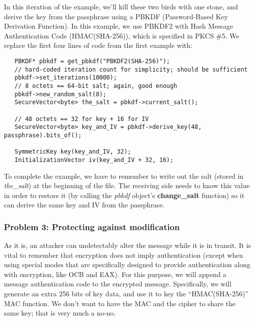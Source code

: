\documentclass{article}
\newcommand{\function}[1]{\textbf{#1}}
\newcommand{\variable}[1]{\textsl{#1}}
\begin{document}
In this iteration of the example, we'll kill these two birds with one
stone, and derive the key from the passphrase using a PBKDF
(Password-Based Key Derivation Function). In this example, we use
PBKDF2 with Hash Message Authentication Code (HMAC(SHA-256)), which is
specified in PKCS \#5. We replace the first four lines of code from
the first example with:

\begin{verbatim}
   PBKDF* pbkdf = get_pbkdf("PBKDF2(SHA-256)");
   // hard-coded iteration count for simplicity; should be sufficient
   pbkdf->set_iterations(10000);
   // 8 octets == 64-bit salt; again, good enough
   pbkdf->new_random_salt(8);
   SecureVector<byte> the_salt = pbkdf->current_salt();

   // 48 octets == 32 for key + 16 for IV
   SecureVector<byte> key_and_IV = pbkdf->derive_key(48, passphrase).bits_of();

   SymmetricKey key(key_and_IV, 32);
   InitializationVector iv(key_and_IV + 32, 16);
\end{verbatim}

To complete the example, we have to remember to write out the salt (stored in
\variable{the\_salt}) at the beginning of the file. The receiving side needs to
know this value in order to restore it (by calling the \variable{pbkdf} object's
\function{change\_salt} function) so it can derive the same key and IV from the
passphrase.

\subsubsection{Problem 3: Protecting against modification}

As it is, an attacker can undetectably alter the message while it is
in transit. It is vital to remember that encryption does not imply
authentication (except when using special modes that are specifically
designed to provide authentication along with encryption, like OCB and
EAX). For this purpose, we will append a message authentication code
to the encrypted message. Specifically, we will generate an extra 256
bits of key data, and use it to key the ``HMAC(SHA-256)'' MAC
function. We don't want to have the MAC and the cipher to share the
same key; that is very much a no-no.
\end{document}
